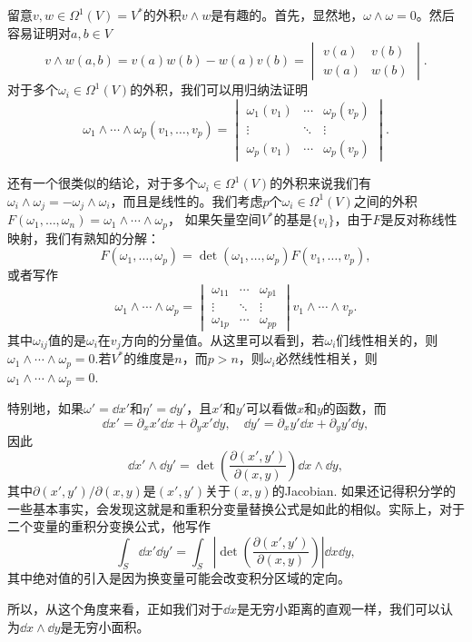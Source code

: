 \para 留意$v,w\in \Omega^1(V)=V^*$的外积$v\wedge w$是有趣的。首先，显然地，$\omega\wedge\omega=0$。然后容易证明对$a,b\in V$
\[
	v\wedge w(a,b)=v(a)w(b)- w(a)v(b)=\begin{vmatrix}v(a)&v(b)\\w(a)&w(b)\end{vmatrix}.
\]
对于多个$\omega_i \in \Omega^1(V)$的外积，我们可以用归纳法证明
\[
	\omega_1\wedge \cdots \wedge\omega_p(v_1,\dots,v_p)=
	\begin{vmatrix}
		\omega_1(v_1)&\cdots&\omega_p(v_p)\\
		\vdots&\ddots&\vdots\\
		\omega_p(v_1)&\cdots&\omega_p(v_p)
	\end{vmatrix}.
\]

\para 还有一个很类似的结论，对于多个$\omega_i \in \Omega^1(V)$的外积来说我们有$\omega_i \wedge \omega_j=-\omega_j \wedge \omega_i$，而且是线性的。我们考虑$p$个$\omega_i \in \Omega^1(V)$之间的外积$F(\omega_1, \dots,\omega_n)=\omega_1\wedge \cdots \wedge \omega_p$，
如果矢量空间$V^*$的基是$\{v_i\}$，由于$F$是反对称线性映射，我们有熟知的分解：
\[
	F(\omega_1, \dots,\omega_p)=\det(\omega_1, \dots,\omega_p)F(v_1, \dots,v_p),
\]
或者写作
\[
	\omega_1\wedge \cdots \wedge \omega_p=
	\begin{vmatrix}
		\omega_{11}&\cdots&\omega_{p1}\\
		\vdots&\ddots&\vdots\\
		\omega_{1p}&\cdots&\omega_{pp}
	\end{vmatrix}
	v_1\wedge \cdots \wedge v_p.
\]
其中$\omega_{ij}$值的是$\omega_i$在$v_j$方向的分量值。从这里可以看到，若$\omega_i$们线性相关的，则$\omega_1\wedge \cdots \wedge \omega_p=0$.若$V^*$的维度是$n$，而$p>n$，则$\omega_i$必然线性相关，则$\omega_1\wedge \cdots \wedge \omega_p=0$.

\para 特别地，如果$\omega'=\dd x'$和$\eta'=\dd y'$，且$x'$和$y'$可以看做$x$和$y$的函数，而
\[
	\dd x'=\partial_x x' \dd x+\partial_y x' \dd y,\quad \dd y'=\partial_x y' \dd x+\partial_y y' \dd y,
\]
因此
\[
	\dd x'\wedge \dd y'=\det\left(\frac{\partial(x',y')}{\partial (x,y)}\right)\dd x\wedge \dd y,
\]
其中$\partial(x',y')/\partial (x,y)$是$(x',y')$关于$(x,y)$的Jacobian. 如果还记得积分学的一些基本事实，会发现这就是和重积分变量替换公式是如此的相似。实际上，对于二个变量的重积分变换公式，他写作
\[
	\int_S\dd x' \dd y'=\int_S\left|\det\left(\frac{\partial(x',y')}{\partial (x,y)}\right)\right|\dd x \dd y,
\]
其中绝对值的引入是因为换变量可能会改变积分区域的定向。

所以，从这个角度来看，正如我们对于$\dd x$是无穷小距离的直观一样，我们可以认为$\dd x\wedge \dd y$是无穷小面积。


